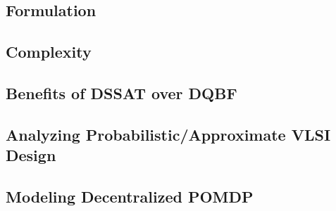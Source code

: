 \subsection{Formulation}

\subsection{Complexity}

\subsection{Benefits of DSSAT over DQBF}

\subsection{Analyzing Probabilistic/Approximate VLSI Design}

\subsection{Modeling Decentralized POMDP}
